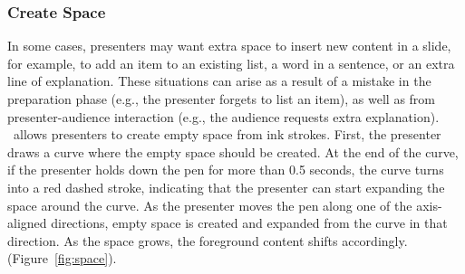 \subsubsection{Create Space}
In some cases, presenters may want extra space to insert new content in a slide, for example, to add an item to an existing list, a word in a sentence, or an extra line of explanation. These situations can arise as a result of a mistake in the preparation phase (e.g., the presenter forgets to list an item), as well as from presenter-audience interaction (e.g., the audience requests extra explanation). \interface\ allows presenters to create empty space from ink strokes. First, the presenter draws a curve where the empty space should be created. At the end of the curve, if the presenter holds down the pen for more than 0.5 seconds, the curve turns into a red dashed stroke, indicating that the presenter can start expanding the space around the curve. As the presenter moves the pen along one of the axis-aligned directions, empty space is created and expanded from the curve in that direction.  As the space grows, the foreground content shifts accordingly. (Figure~\ref{fig:space}).

